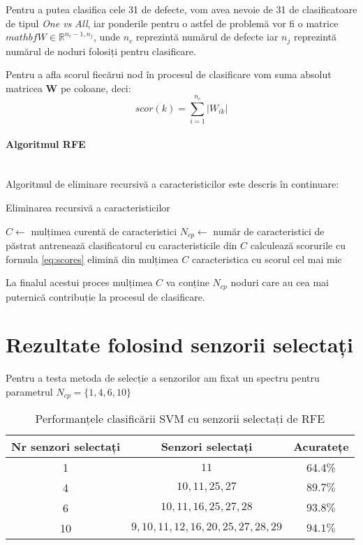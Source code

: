 Pentru a putea clasifica cele 31 de defecte, vom avea nevoie de 31 de clasificatoare de tipul \textit{One vs All}, iar ponderile pentru o astfel de problemă vor fi o matrice $mathbf{\textit{W}} \in \mathbb{R}^{n_{c}-1, n_{j}}$, unde $n_c$ reprezintă numărul de defecte iar $n_j$ reprezintă numărul de noduri folosiți pentru clasificare.

Pentru a afla scorul fiecărui nod în procesul de clasificare vom suma absolut matricea $\mathbf{W}$ pe coloane, deci:
\begin{equation}
    scor(k) = \sum_{i=1}^{n_c} |W_{ik}|
    \label{eq:scores}
\end{equation}

\paragraph{Algoritmul RFE} \mbox{} \\

Algoritmul de eliminare recursivă a caracteristicilor este descris în continuare:
\begin{algorithm2e}
\caption{Eliminarea recursivă a caracteristicilor}
\label{alg:rfe}
$C \leftarrow$ mulțimea curentă de caracteristici\;
$N_{cp} \leftarrow$ număr de caracteristici de păstrat\;
 {
    antrenează clasificatorul cu caracteristicile din $C$\;
    calculează scorurile cu formula \eqref{eq:scores}\;
    elimină din mulțimea $C$ caracteristica cu scorul cel mai mic
}
\end{algorithm2e}

La finalul acestui proces mulțimea $C$ va conține $N_{cp}$ noduri care au cea mai puternică contribuție la procesul de clasificare.

\section{Rezultate folosind senzorii selectați}

Pentru a testa metoda de selecție a senzorilor am fixat un spectru pentru parametrul $N_{cp} = \{1, 4, 6, 10\}$ 

\begin{table}
    \centering
    \begin{tabular}{|c|c|c|}
    \hline
        Nr senzori selectați & Senzori selectați & Acuratețe \\
        \hline
        1 & $11$ & 64.4\% \\
        \hline
        4 & $10, 11, 25, 27$ & $89.7\%$\\
        \hline
        6 & $10, 11, 16, 25, 27, 28$ & $93.8\%$\\
        \hline
        10 & $ 9, 10, 11, 12, 16, 20, 25, 27, 28, 29 $ & $94.1\%$ \\
        \hline
    \end{tabular}
    \caption{Performanțele clasificării SVM cu senzorii selectați de RFE}
    \label{tab:rfe_selected_sensors}
\end{table}

